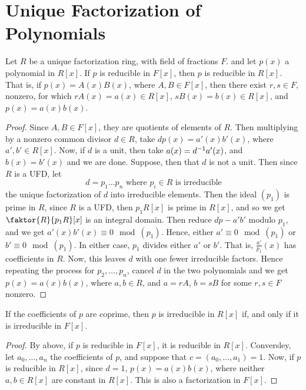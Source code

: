 \section{Unique Factorization of Polynomials}
\label{section_7.2}

\begin{lemma}[Gauss]\label{lemma_7.2.1}
  Let $R$ be a unique factorization ring, with field of fractions $F$. and let
  $p(x)$ a polynomial in $R[x]$. If $p$ is reducible in $F[x]$, then $p$ is
  reducible in  $R[x]$. That is, if $p(x)=A(x)B(x)$, where $A,B \in F[x]$,
  then there exist $r,s \in F$, nonzero, for which  $rA(x)=a(x) \in R[x]$,
  $sB(x)=b(x) \in R[x]$, and $p(x)=a(x)b(x)$.
\end{lemma}
\begin{proof}
  Since $A,B \in F[x]$, they are quotients of elements of $R$. Then
  multiplying by a nonzero common divisor  $d \in R$, take  $dp(x)=a'(x)b'(x)$,
  where $a',b' \in R[x]$. Now, if $d$ is a unit, then take
  $a(x)=d^{-1}a'(x)$, and $b(x)=b'(x)$ and we are done. Suppose, then that
  $d$ is not a unit. Then since  $R$ is a UFD, let
  \begin{equation*}
    d=p_1 \dots p_n \text{ where } p_i \in R \text{ is irreducible}
  \end{equation*}
  the unique factorization of $d$ into irreducible elements. Then the ideal
  $(p_1)$ is prime in $R$, since  $R$ is a UFD, then  $p_1R[x]$ is prime in
  $R[x]$, and so we get $\faktor{R}{p_1R}[x]$ is an integral domain. Then
  reduce $dp-a'b'$ modulo  $p_1$, and we get $a'(x)b'(x) \equiv 0
  \mod{(p_1)}$. Hence, either $a' \equiv 0 \mod{(p_1)}$ or $b' \equiv 0
  \mod{(p_1)}$. In either case, $p_1$ divides either $a'$ or  $b'$. That is,
  $\frac{a'}{p_1}(x)$ has coefficients in $R$. Now, this leaves  $d$ with one
  fewer irreducible factors. Hence repeating the process for  $p_2, \dots,
  p_n$, cancel $d$ in the two polynomials and we get  $p(x)=a(x)b(x)$, where
  $a,b \in R$, and  $a=rA$,  $b=sB$ for some  $r,s \in F$ nonzero.
\end{proof}
\begin{corollary}
  If the coefficients of $p$ are coprime, then  $p$ is irreducible in  $R[x]$
  if, and only if it is irreducible in $F[x]$.
\end{corollary}
\begin{proof}
  By above, if $p$ is reducible in  $F[x]$, it is reducible in $R[x]$.
  Conversley, let $a_0, \dots, a_n$ the coefficients of $p$, and suppose that
  $c=(a_0, \dots, a_1)=1$. Now, if $p$ is reducible in $R[x]$, since $d=1$,
  $p(x)=a(x)b(x)$, where neither $a,b \in R[x]$ are constant in $R[x]$. This
  is also a factorization in $F[x]$.
\end{proof}

